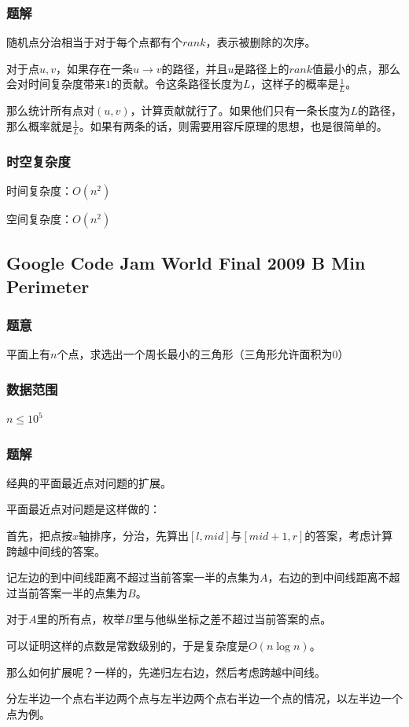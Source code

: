 \documentclass{ctexart}
\begin{document}
\subsubsection{题解}
随机点分治相当于对于每个点都有个$rank$，表示被删除的次序。

对于点$u,v$，如果存在一条$u \rightarrow v$的路径，并且$u$是路径上的$rank$值最小的点，那么会对时间复杂度带来$1$的贡献。令这条路径长度为$L$，这样子的概率是$\frac{1}{L}$。

那么统计所有点对$(u,v)$，计算贡献就行了。如果他们只有一条长度为$L$的路径，那么概率就是$\frac{1}{L}$。如果有两条的话，则需要用容斥原理的思想，也是很简单的。
\subsubsection{时空复杂度}
时间复杂度：$O(n^2)$

空间复杂度：$O(n^2)$
\subsection{Google Code Jam World Final 2009 B Min Perimeter}
\subsubsection{题意}
平面上有$n$个点，求选出一个周长最小的三角形（三角形允许面积为$0$）
\subsubsection{数据范围}
$n \le 10^5$
\subsubsection{题解}
经典的平面最近点对问题的扩展。

平面最近点对问题是这样做的：

首先，把点按$x$轴排序，分治，先算出$[l,mid]$与$[mid+1,r]$的答案，考虑计算跨越中间线的答案。

记左边的到中间线距离不超过当前答案一半的点集为$A$，右边的到中间线距离不超过当前答案一半的点集为$B$。

对于$A$里的所有点，枚举$B$里与他纵坐标之差不超过当前答案的点。

可以证明这样的点数是常数级别的，于是复杂度是$O(n \log n)$。

那么如何扩展呢？一样的，先递归左右边，然后考虑跨越中间线。

分左半边一个点右半边两个点与左半边两个点右半边一个点的情况，以左半边一个点为例。
\end{document}
